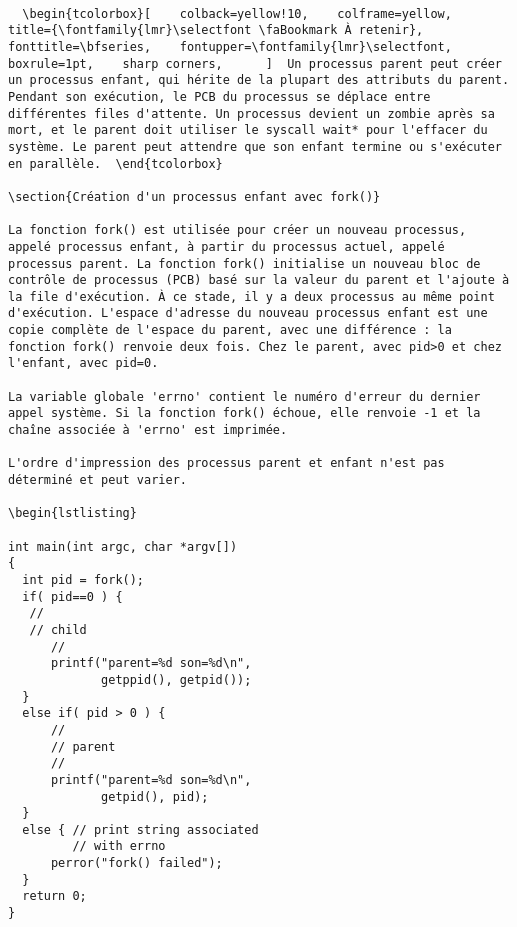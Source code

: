 \documentclass[12pt]{report}
\begin{document}
\begin{lstlisting}

  \begin{tcolorbox}[    colback=yellow!10,    colframe=yellow,    title={\fontfamily{lmr}\selectfont \faBookmark À retenir},    fonttitle=\bfseries,    fontupper=\fontfamily{lmr}\selectfont,    boxrule=1pt,    sharp corners,      ]  Un processus parent peut créer un processus enfant, qui hérite de la plupart des attributs du parent. Pendant son exécution, le PCB du processus se déplace entre différentes files d'attente. Un processus devient un zombie après sa mort, et le parent doit utiliser le syscall wait* pour l'effacer du système. Le parent peut attendre que son enfant termine ou s'exécuter en parallèle.  \end{tcolorbox}  

\section{Création d'un processus enfant avec fork()} 

La fonction fork() est utilisée pour créer un nouveau processus, appelé processus enfant, à partir du processus actuel, appelé processus parent. La fonction fork() initialise un nouveau bloc de contrôle de processus (PCB) basé sur la valeur du parent et l'ajoute à la file d'exécution. À ce stade, il y a deux processus au même point d'exécution. L'espace d'adresse du nouveau processus enfant est une copie complète de l'espace du parent, avec une différence : la fonction fork() renvoie deux fois. Chez le parent, avec pid>0 et chez l'enfant, avec pid=0. 

La variable globale 'errno' contient le numéro d'erreur du dernier appel système. Si la fonction fork() échoue, elle renvoie -1 et la chaîne associée à 'errno' est imprimée. 

L'ordre d'impression des processus parent et enfant n'est pas déterminé et peut varier. 

\begin{lstlisting}

int main(int argc, char *argv[])
{
  int pid = fork();
  if( pid==0 ) { 
   //
   // child
      //
      printf("parent=%d son=%d\n",
             getppid(), getpid());
  }
  else if( pid > 0 ) {
      //
      // parent
      //
      printf("parent=%d son=%d\n",
             getpid(), pid);
  }
  else { // print string associated
         // with errno   
      perror("fork() failed"); 
  }
  return 0;
}

\end{lstlisting}
\end{document}
